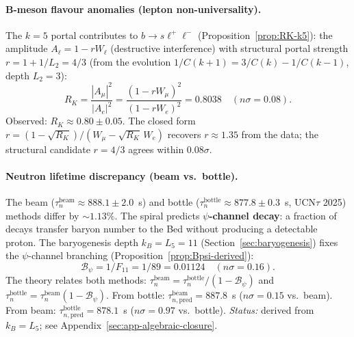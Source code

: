 \documentclass[12pt,a4paper]{article}
\begin{document}
\paragraph{B-meson flavour anomalies (lepton non-universality).}
The $k=5$ portal contributes to $b \to s \ell^+ \ell^-$ (Proposition~\ref{prop:RK-k5}): the amplitude $A_\ell = 1 - r W_\ell$ (destructive interference) with structural portal strength $r = 1 + 1/L_2 = 4/3$ (from the evolution $1/C(k{+}1) = 3/C(k) - 1/C(k{-}1)$, depth $L_2 = 3$):
\begin{equation}
\label{eq:rk-amplitude}
R_K = \frac{|A_\mu|^2}{|A_e|^2} = \frac{(1 - r W_\mu)^2}{(1 - r W_e)^2} = 0.8038 \quad (n\sigma = 0.08).
\end{equation}
Observed: $R_K \approx 0.80 \pm 0.05$. The closed form $r = (1 - \sqrt{R_K})/(W_\mu - \sqrt{R_K}\,W_e)$ recovers $r \approx 1.35$ from the data; the structural candidate $r = 4/3$ agrees within $0.08\sigma$.

\paragraph{Neutron lifetime discrepancy (beam vs.\ bottle).}
The beam ($\tau_n^{\mathrm{beam}} \approx 888.1 \pm 2.0$~s) and bottle ($\tau_n^{\mathrm{bottle}} \approx 877.8 \pm 0.3$~s, UCN$\tau$ 2025) methods differ by $\sim 1.13\%$. The spiral predicts \textbf{$\psi$-channel decay}: a fraction of decays transfer baryon number to the Bed without producing a detectable proton. The baryogenesis depth $k_B = L_5 = 11$ (Section~\ref{sec:baryogenesis}) fixes the $\psi$-channel branching (Proposition~\ref{prop:Bpsi-derived}):
\begin{equation}
\mathcal{B}_\psi = 1/F_{11} = 1/89 = 0.01124 \quad (n\sigma = 0.16).
\end{equation}
The theory relates both methods: $\tau_n^{\mathrm{beam}} = \tau_n^{\mathrm{bottle}}/(1 - \mathcal{B}_\psi)$ and $\tau_n^{\mathrm{bottle}} = \tau_n^{\mathrm{beam}}(1 - \mathcal{B}_\psi)$. From bottle: $\tau_{n,\mathrm{pred}}^{\mathrm{beam}} = 887.8$~s ($n\sigma = 0.15$ vs.\ beam). From beam: $\tau_{n,\mathrm{pred}}^{\mathrm{bottle}} = 878.1$~s ($n\sigma = 0.97$ vs.\ bottle). \textit{Status:} derived from $k_B = L_5$; see Appendix~\ref{sec:app-algebraic-closure}.
\end{document}
